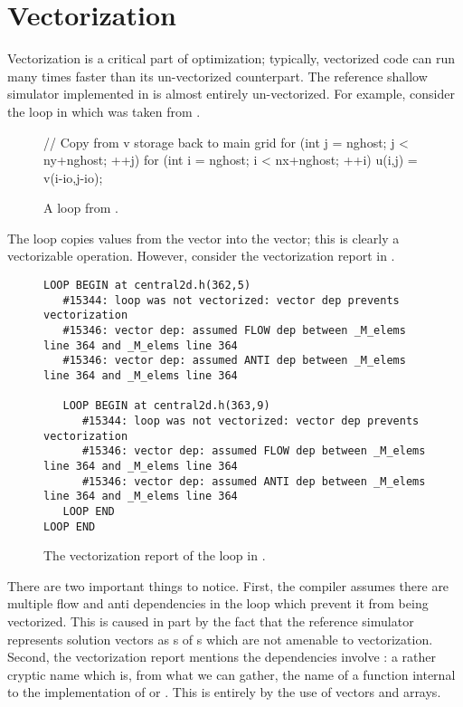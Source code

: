 \section{Vectorization}\label{sec:vectorization}
Vectorization is a critical part of optimization; typically, vectorized code
can run many times faster than its un-vectorized counterpart. The reference
shallow simulator implemented in  is almost entirely
un-vectorized. For example, consider the loop in  which was
taken from .

\begin{figure}[h]
\centering
\begin{CPP}[firstnumber=361]
// Copy from v storage back to main grid
for (int j = nghost; j < ny+nghost; ++j){
    for (int i = nghost; i < nx+nghost; ++i){
        u(i,j) = v(i-io,j-io);
    }
}
\end{CPP}
\caption{A loop from .}
\label{fig:no-vec-code}
\end{figure}

The loop copies values from the  vector into the  vector; this is
clearly a vectorizable operation. However, consider the vectorization report in
.

\begin{figure}[h]
\scriptsize
\begin{verbatim}LOOP BEGIN at central2d.h(362,5)
   #15344: loop was not vectorized: vector dep prevents vectorization
   #15346: vector dep: assumed FLOW dep between _M_elems line 364 and _M_elems line 364
   #15346: vector dep: assumed ANTI dep between _M_elems line 364 and _M_elems line 364

   LOOP BEGIN at central2d.h(363,9)
      #15344: loop was not vectorized: vector dep prevents vectorization
      #15346: vector dep: assumed FLOW dep between _M_elems line 364 and _M_elems line 364
      #15346: vector dep: assumed ANTI dep between _M_elems line 364 and _M_elems line 364
   LOOP END
LOOP END\end{verbatim}
\caption{The vectorization report of the loop in .}
\label{fig:no-vec-report}
\end{figure}

There are two important things to notice. First, the compiler assumes there are
multiple flow and anti dependencies in the loop which prevent it from being
vectorized. This is caused in part by the fact that the reference simulator
represents solution vectors as \cppvec{}s of \cpparr{}s which are not amenable
to vectorization. Second, the vectorization report mentions the dependencies
involve : a rather cryptic name which is, from what we can
gather, the name of a function internal to the implementation of \cppvec{} or
\cpparr{}. This is entirely by the use of vectors and arrays.

